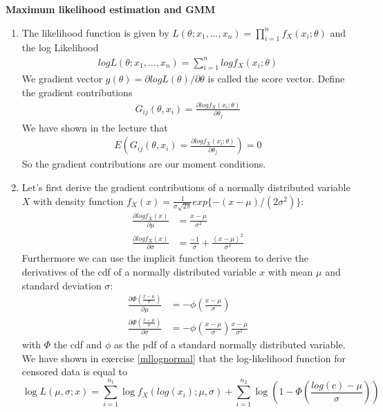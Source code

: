 \documentclass{article}
\begin{document}
\begin{solution}
\textbf{Maximum likelihood estimation and GMM}

\begin{enumerate}
\item The likelihood function is given by $L(\theta;x_1,\dots,x_n)=\prod_{i=1}^{n}f_X(x_i;\theta)$ and the log Likelihood
\begin{align*}
  logL(\theta;x_1,\dots,x_n)=\sum_{i=1}^{n}log f_X(x_i;\theta)
\end{align*}
We gradient vector $g(\theta)=\partial log L(\theta)/\partial \theta$ is called the score vector. Define the gradient contributions
\begin{align*}
G_{ij}(\theta,x_i) = \frac{\partial log f_X(x_i;\theta)}{\partial \theta_j}
\end{align*}
We have shown in the lecture that
\begin{align*}
E(G_{ij}(\theta,x_i) = \frac{\partial log f_X(x_i;\theta)}{\partial \theta_j}) = 0
\end{align*}
So the gradient contributions are our moment conditions.
\item Let's first derive the gradient contributions of a normally distributed variable $X$ with density function $f_X(x)=\frac{1}{\sigma\sqrt{2\pi}}exp\{-(x-\mu)/(2\sigma^2)\}$:
\begin{align*}
\frac{\partial log f_X(x)}{\partial \mu} &= \frac{x-\mu}{\sigma^2}\\
\frac{\partial log f_X(x)}{\partial \sigma} &= \frac{-1}{\sigma} + \frac{(x-\mu)^2}{\sigma^3}
\end{align*}
Furthermore we can use the implicit function theorem to derive the derivatives of the cdf of a normally distributed variable $x$ with mean $\mu$ and standard deviation $\sigma$:
\begin{align*}
  \frac{\partial \Phi\left(\frac{x-\mu}{\sigma}\right)}{\partial \mu} &=-\phi\left(\frac{x-\mu}{\sigma}\right)\\
  \frac{\partial \Phi\left(\frac{x-\mu}{\sigma}\right)}{\partial \sigma} &=-\phi\left(\frac{x-\mu}{\sigma}\right)\frac{x-\mu}{\sigma^2}
\end{align*}
with $\Phi$ the cdf and $\phi$ as the pdf of a standard normally distributed variable. We have shown in exercise \ref{mllognormal} that the log-likelihood function for censored data is equal to
\begin{equation*}
\log L(\mu,\sigma; x) = \sum_{i=1}^{n_1} \log f_X(log(x_i);\mu,\sigma) + \sum_{i=1}^{n_2} \log\left(1-\Phi\left(\frac{log(c)-\mu}{\sigma}\right)\right)

\end{equation*}
\end{enumerate}
\end{solution}
\end{document}
